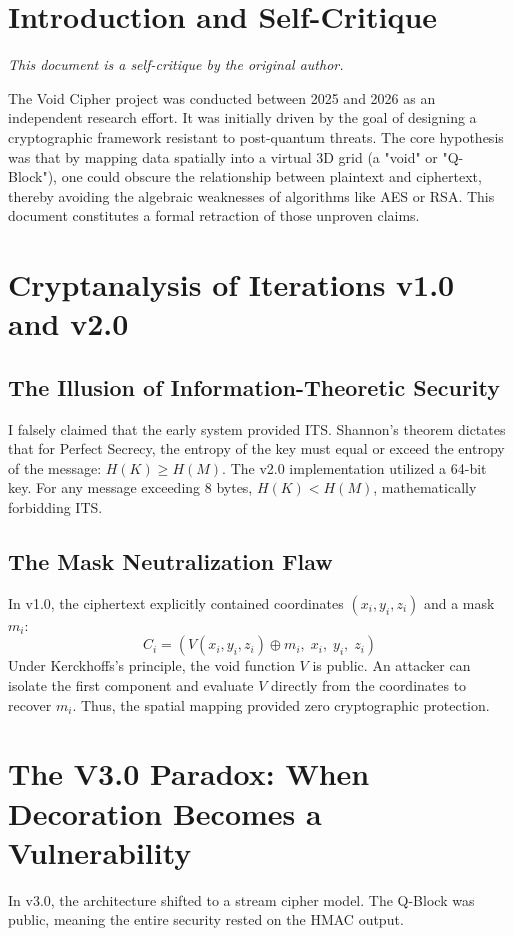 \documentclass[12pt,a4paper]{article}
\begin{document}
\section{Introduction and Self-Critique}
\textit{This document is a self-critique by the original author.}

The Void Cipher project was conducted between 2025 and 2026 as an independent research effort. It was initially driven by the goal of designing a cryptographic framework resistant to post-quantum threats. The core hypothesis was that by mapping data spatially into a virtual 3D grid (a "void" or "Q-Block"), one could obscure the relationship between plaintext and ciphertext, thereby avoiding the algebraic weaknesses of algorithms like AES or RSA. This document constitutes a formal retraction of those unproven claims.

\section{Cryptanalysis of Iterations v1.0 and v2.0}
\subsection{The Illusion of Information-Theoretic Security}
I falsely claimed that the early system provided ITS. Shannon's theorem dictates that for Perfect Secrecy, the entropy of the key must equal or exceed the entropy of the message: \(H(K) \ge H(M)\). The v2.0 implementation utilized a 64-bit key. For any message exceeding 8 bytes, \(H(K) < H(M)\), mathematically forbidding ITS.

\subsection{The Mask Neutralization Flaw}
In v1.0, the ciphertext explicitly contained coordinates \((x_i, y_i, z_i)\) and a mask \(m_i\):
\begin{equation}
C_i = (V(x_i, y_i, z_i) \oplus m_i, \; x_i, \; y_i, \; z_i)
\end{equation}
Under Kerckhoffs's principle, the void function \(V\) is public. An attacker can isolate the first component and evaluate \(V\) directly from the coordinates to recover \(m_i\). Thus, the spatial mapping provided zero cryptographic protection.

\section{The V3.0 Paradox: When Decoration Becomes a Vulnerability}
In v3.0, the architecture shifted to a stream cipher model. The Q-Block was public, meaning the entire security rested on the HMAC output.
\end{document}
